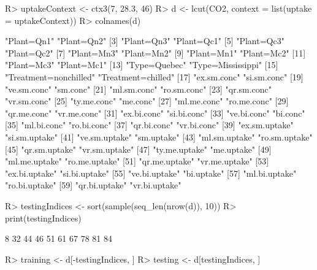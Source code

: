 \documentclass{article}\usepackage[]{graphicx}\usepackage[]{color}
\begin{document}
\begin{Schunk}
% --begin: "pbld2"
\begin{Sinput}
R> uptakeContext <- ctx3(7, 28.3, 46)
R> d <- lcut(CO2, context = list(uptake = uptakeContext))
R> colnames(d)
\end{Sinput}
\begin{Soutput}
 [1] "Plant=Qn1"            "Plant=Qn2"           
 [3] "Plant=Qn3"            "Plant=Qc1"           
 [5] "Plant=Qc3"            "Plant=Qc2"           
 [7] "Plant=Mn3"            "Plant=Mn2"           
 [9] "Plant=Mn1"            "Plant=Mc2"           
[11] "Plant=Mc3"            "Plant=Mc1"           
[13] "Type=Quebec"          "Type=Mississippi"    
[15] "Treatment=nonchilled" "Treatment=chilled"   
[17] "ex.sm.conc"           "si.sm.conc"          
[19] "ve.sm.conc"           "sm.conc"             
[21] "ml.sm.conc"           "ro.sm.conc"          
[23] "qr.sm.conc"           "vr.sm.conc"          
[25] "ty.me.conc"           "me.conc"             
[27] "ml.me.conc"           "ro.me.conc"          
[29] "qr.me.conc"           "vr.me.conc"          
[31] "ex.bi.conc"           "si.bi.conc"          
[33] "ve.bi.conc"           "bi.conc"             
[35] "ml.bi.conc"           "ro.bi.conc"          
[37] "qr.bi.conc"           "vr.bi.conc"          
[39] "ex.sm.uptake"         "si.sm.uptake"        
[41] "ve.sm.uptake"         "sm.uptake"           
[43] "ml.sm.uptake"         "ro.sm.uptake"        
[45] "qr.sm.uptake"         "vr.sm.uptake"        
[47] "ty.me.uptake"         "me.uptake"           
[49] "ml.me.uptake"         "ro.me.uptake"        
[51] "qr.me.uptake"         "vr.me.uptake"        
[53] "ex.bi.uptake"         "si.bi.uptake"        
[55] "ve.bi.uptake"         "bi.uptake"           
[57] "ml.bi.uptake"         "ro.bi.uptake"        
[59] "qr.bi.uptake"         "vr.bi.uptake"        
\end{Soutput}
%
% --end: "pbld2"
\end{Schunk}

\begin{Schunk}
% --begin: "pbld3"
\begin{Sinput}
R> testingIndices <- sort(sample(seq_len(nrow(d)), 10))
R> print(testingIndices)
\end{Sinput}
\begin{Soutput}
 [1]  8 32 44 46 51 61 67 78 81 84
\end{Soutput}
\begin{Sinput}
R> training <- d[-testingIndices, ]
R> testing <- d[testingIndices, ]
\end{Sinput}
%
% --end: "pbld3"
\end{Schunk}
\end{document}
